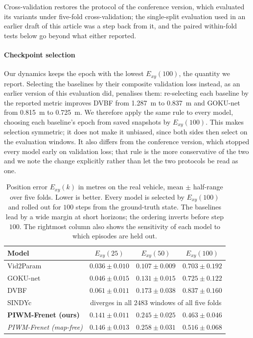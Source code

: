 Cross-validation restores the protocol of the conference version, which evaluated
its variants under five-fold cross-validation; the single-split evaluation used in
an earlier draft of this article was a step back from it, and the paired
within-fold tests below go beyond what either reported.

\paragraph{Checkpoint selection}
Our dynamics keeps the epoch with the lowest $E_{xy}(100)$, the quantity we
report. Selecting the baselines by their composite validation loss instead, as
an earlier version of this evaluation did, penalises them: re-selecting each
baseline by the reported metric improves DVBF from \SI{1.287}{m} to
\SI{0.837}{m} and GOKU-net from \SI{0.815}{m} to \SI{0.725}{m}. We therefore
apply the same rule to every model, choosing each baseline's epoch from
saved snapshots by $E_{xy}(100)$. This makes selection symmetric; it does not
make it unbiased, since both sides then select on the evaluation windows. It also
differs from the conference version, which stopped every model early on validation
loss; that rule is the more conservative of the two and we note the change
explicitly rather than let the two protocols be read as one.

\begin{table}[t]
\centering
\caption{Position error $E_{xy}(k)$ in metres on the real vehicle, mean $\pm$
half-range over five folds. Lower is better. Every model is selected by
$E_{xy}(100)$ and rolled out for $100$ steps from the ground-truth state. The
baselines lead by a wide margin at short horizons; the ordering inverts before
step $100$. The rightmost column also shows the sensitivity of each model to
which episodes are held out.}
\label{tab:donkey_main}
\begin{tabular}{lccc}
\toprule
Model & $E_{xy}(25)$ & $E_{xy}(50)$ & $E_{xy}(100)$ \\
\midrule
Vid2Param~\cite{asenov2019vid2param}  & $\mathbf{0.036 \pm 0.010}$ & $\mathbf{0.107 \pm 0.009}$ & $0.703 \pm 0.192$ \\
GOKU-net~\cite{linial_generative_2021} & $0.046 \pm 0.015$ & $0.131 \pm 0.015$ & $0.725 \pm 0.122$ \\
DVBF~\cite{karl2016deep}              & $0.061 \pm 0.011$ & $0.173 \pm 0.038$ & $0.837 \pm 0.160$ \\
SINDYc~\cite{BRUNTON2016710}          & \multicolumn{3}{c}{diverges in all $2483$ windows of all five folds} \\
\midrule
\textbf{PIWM-Frenet (ours)}           & $0.141 \pm 0.011$ & $0.245 \pm 0.025$ & $\mathbf{0.463 \pm 0.046}$ \\
\textit{PIWM-Frenet (map-free)}       & $0.146 \pm 0.013$ & $0.258 \pm 0.031$ & $0.516 \pm 0.068$ \\
\bottomrule
\end{tabular}
\end{table}

